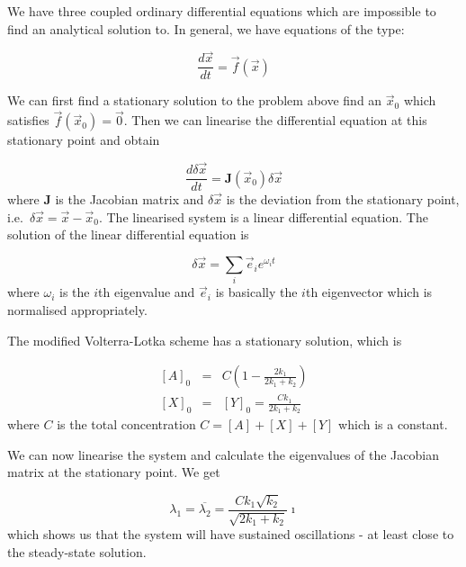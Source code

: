 We have three coupled ordinary differential equations which are
impossible to find an analytical solution to. In general, we have
equations of the type:

\[
  \frac{d\vec{x}}{dt} = \vec{f}(\vec{x})
\]

We can first find a stationary solution to the problem above \ie
find an $\vec{x}_0$ which satisfies $\vec{f}(\vec{x}_0) =
\vec{0}$. Then we can linearise the differential equation at this
stationary point and obtain

\[
  \frac{d\delta\vec{x}}{dt} = \mathbf{J}(\vec{x}_0) \delta\vec{x}
\]
where $\mathbf{J}$ is the Jacobian matrix and $\delta\vec{x}$ is the
deviation from the stationary point, i.e.\ $\delta\vec{x} =
\vec{x}-\vec{x}_0$. The linearised system is a linear differential
equation. The solution of the linear differential equation is 

\[
  \delta\vec{x} = \sum_{i} \vec{e}_i e^{\omega_i t}
\]
where $\omega_i$ is the $i$th eigenvalue and $\vec{e}_i$ is basically
the $i$th eigenvector which is normalised appropriately.

The modified Volterra-Lotka scheme has a stationary solution, which is

\begin{eqnarray*}
  {[A]}_0 &=& C \left( 1-\frac{2k_1}{2k_1+k_2} \right) \\
  {[X]}_0 &=& {[Y]}_0 = \frac{C k_1}{2k_1 + k_2}
\end{eqnarray*}
where $C$ is the total concentration \ie $C = [A]+[X]+[Y]$ which is a 
constant.

We can now linearise the system and calculate the eigenvalues of the Jacobian 
matrix at the stationary point. We get

\[
  \lambda_1 = \overline{\lambda_2} 
  = \frac{C k_1 \sqrt{k_2}}{\sqrt{2k_1 + k_2}}\imath
\]
which shows us that the system will have sustained oscillations - at least
close to the steady-state solution.


